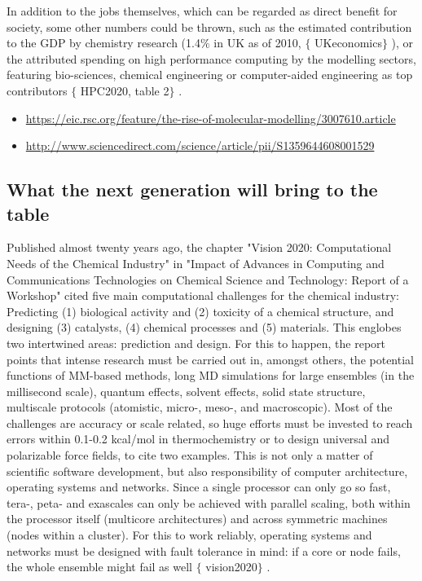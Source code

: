 In addition to the jobs themselves, which can be regarded as direct benefit for society, some other numbers could be thrown, such as the estimated contribution to the GDP by chemistry research (1.4$\%$  in UK as of 2010, $ \{ $ UKeconomics$ \} $ ), or the attributed spending on high performance computing by the modelling sectors, featuring bio-sciences, chemical engineering or computer-aided engineering as top contributors $ \{ $ HPC2020, table 2$ \} $ .

\begin{itemize}
	\item \href{https://eic.rsc.org/feature/the-rise-of-molecular-modelling/3007610.article}{https://eic.rsc.org/feature/the-rise-of-molecular-modelling/3007610.article}

	\item \href{http://www.sciencedirect.com/science/article/pii/S1359644608001529}{http://www.sciencedirect.com/science/article/pii/S1359644608001529}
\end{itemize}

\subsection{What the next generation will bring to the table}
Published almost twenty years ago, the chapter "Vision 2020: Computational Needs of the Chemical Industry" in "Impact of Advances in Computing and Communications Technologies on Chemical Science and Technology: Report of a Workshop" cited five main computational challenges for the chemical industry: Predicting (1) biological activity and (2) toxicity of a chemical structure, and designing (3) catalysts, (4) chemical processes and (5) materials. This englobes two intertwined areas: prediction and design. For this to happen, the report points that intense research must be carried out in, amongst others, the potential functions of MM-based methods, long MD simulations for large ensembles (in the millisecond scale), quantum effects, solvent effects, solid state structure, multiscale protocols (atomistic, micro-, meso-, and macroscopic). Most of the challenges are accuracy or scale related, so huge efforts must be invested to reach errors within 0.1-0.2 kcal/mol in thermochemistry or to design universal and polarizable force fields, to cite two examples. This is not only a matter of scientific software development, but also responsibility of computer architecture, operating systems and networks. Since a single processor can only go so fast, tera-, peta- and exascales can only be achieved with parallel scaling, both within the processor itself (multicore architectures) and across symmetric machines (nodes within a cluster). For this to work reliably, operating systems and networks must be designed with fault tolerance in mind: if a core or node fails, the whole ensemble might fail as well $ \{ $ vision2020$ \} $ .

